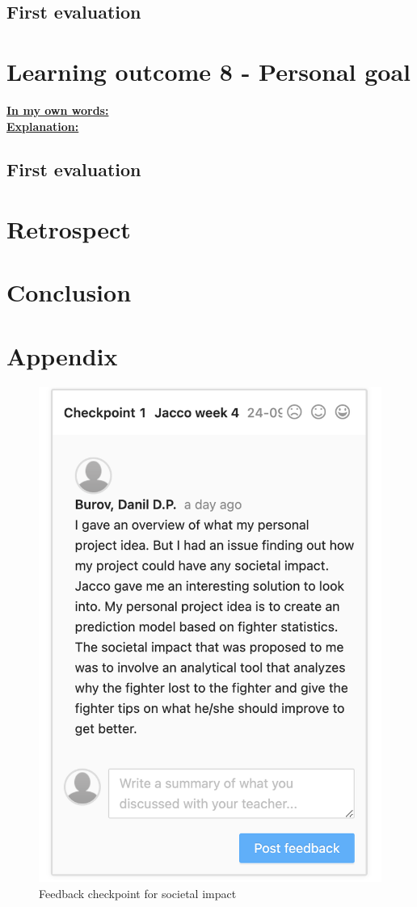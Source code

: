 \documentclass{article}
\begin{document}
\subsection{First evaluation}

\section{Learning outcome 8 - Personal goal}
\underline{\textbf{In my own words:}}\\
\underline{\textbf{Explanation:}}\\
\subsection{First evaluation}

\section{Retrospect} %
\section{Conclusion} %
\section{Appendix}
\begin{figure}[h]
  \centering
  \includegraphics{images/Feedback_Societal_Impact.png}
  \caption{Feedback checkpoint for societal impact}
  \label{fig:appendix_image1}
\end{figure}
\end{document}
